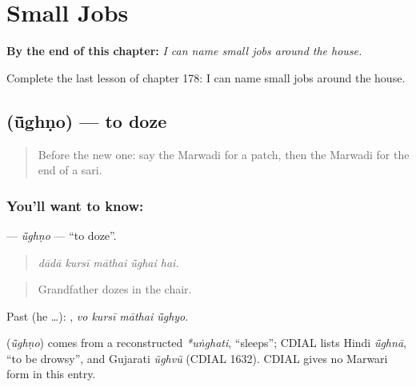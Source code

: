 
\chapter{Small Jobs}
\label{ch:mw-small-jobs}

\begin{chapteropening}
\textbf{By the end of this chapter:} \emph{I can name small jobs around the house.}

Complete the last lesson of chapter 178: I can name small jobs around the house.
\end{chapteropening}

\section[\texorpdfstring{\mw{ऊंघणो} (ū̃ghṇo)}{ऊंघणो (ū̃ghṇo)}]{ (ū̃ghṇo) — to doze}

\label{lesson:MW-C178-ughno}



\begin{quote}
Before the new one: say the Marwadi for a patch, then the Marwadi for the end of a sari.
\end{quote}

\subsection*{You'll want to know: }
\textbf{} — \emph{ū̃ghṇo} — \textquotedblleft{}to doze\textquotedblright{}.

\begin{quote}
    
\end{quote}

\begin{quote}
\emph{dādā kursī māthai ū̃ghai hai.}
\end{quote}

\begin{quote}
Grandfather dozes in the chair.
\end{quote}

Past (he …):    , \emph{vo kursī māthai ū̃ghyo}.

\begin{cousinweb}
\textbf{} (\emph{ū̃ghṇo}) comes from a reconstructed \emph{*uṅghati}, \textquotedblleft{}sleeps\textquotedblright{}; CDIAL lists Hindi \emph{ū̃ghnā}, \textquotedblleft{}to be drowsy\textquotedblright{}, and Gujarati \emph{ũghvũ} (CDIAL 1632). CDIAL gives no Marwari form in this entry.
\end{cousinweb}

